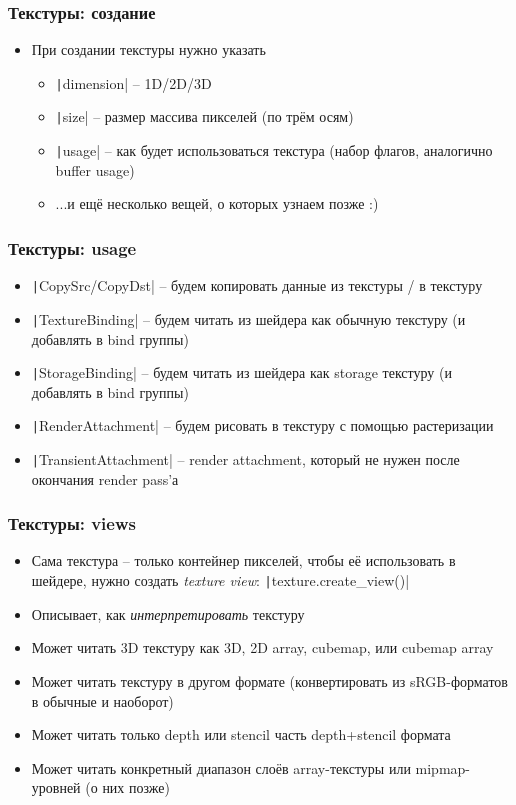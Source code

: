 \documentclass[10pt]{beamer}
\begin{document}
\begin{frame}[fragile]
\frametitle{Текстуры: создание}
\begin{itemize}
\item При создании текстуры нужно указать
\pause
\begin{itemize}
\item \texttt|dimension| -- 1D/2D/3D
\pause
\item \texttt|size| -- размер массива пикселей (по трём осям)
\pause
\item \texttt|usage| -- как будет использоваться текстура (набор флагов, аналогично buffer usage)
\pause
\item ...и ещё несколько вещей, о которых узнаем позже :)
\end{itemize}
\end{itemize}
\end{frame}

\begin{frame}[fragile]
\frametitle{Текстуры: usage}
\begin{itemize}
\item \texttt|CopySrc/CopyDst| -- будем копировать данные из текстуры / в текстуру
\pause
\item \texttt|TextureBinding| -- будем читать из шейдера как обычную текстуру (и добавлять в bind группы)
\pause
\item \texttt|StorageBinding| -- будем читать из шейдера как storage текстуру (и добавлять в bind группы)
\pause
\item \texttt|RenderAttachment| -- будем рисовать в текстуру с помощью растеризации
\pause
\item \texttt|TransientAttachment| -- render attachment, который не нужен после окончания render pass'а
\end{itemize}
\end{frame}

\begin{frame}[fragile]
\frametitle{Текстуры: views}
\begin{itemize}
\item Сама текстура -- только контейнер пикселей, чтобы её использовать в шейдере, нужно создать \textit{texture view}: \texttt|texture.create_view()|
\pause
\item Описывает, как \textit{интерпретировать} текстуру
\pause
\item Может читать 3D текстуру как 3D, 2D array, cubemap, или cubemap array
\pause
\item Может читать текстуру в другом формате (конвертировать из sRGB-форматов в обычные и наоборот)
\pause
\item Может читать только depth или stencil часть depth+stencil формата
\pause
\item Может читать конкретный диапазон слоёв array-текстуры или mipmap-уровней (о них позже)
\end{itemize}
\end{frame}
\end{document}
